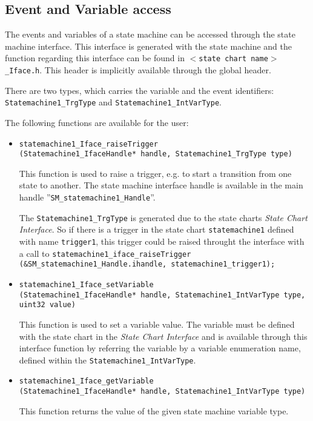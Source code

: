 \subsection{Event and Variable access}

The events and variables of a state machine can be accessed through the state
machine interface. This interface is generated with the state machine and the
function regarding this interface can be found in \texttt{$<$state chart
name$>$\_Iface.h}. This header is implicitly available through the global header.

There are two types, which carries the variable and the event identifiers:
\texttt{Statemachine1\_TrgType} and \texttt{Statemachine1\_IntVarType}.

The following functions are available for the user:

\begin{itemize}
\item \texttt{statemachine1\_Iface\_raiseTrigger\\(Statemachine1\_IfaceHandle*
handle, Statemachine1\_TrgType type)}

This function is used to raise a trigger, e.g. to start a transition from one
state to another. The state machine interface handle is available in the main
handle ''\texttt{SM\_statemachine1\_Handle}''.

The \texttt{Statemachine1\_TrgType} is generated due to the state charts
\textit{State Chart Interface}. So if there is a trigger in the state chart
\texttt{statemachine1} defined with name \texttt{trigger1}, this trigger could be
raised throught the interface with a call to
\texttt{statemachine1\_iface\_raiseTrigger (\&SM\_statemachine1\_Handle.ihandle,
statemachine1\_trigger1);}
 
\item \texttt{statemachine1\_Iface\_setVariable\\(Statemachine1\_IfaceHandle*
handle, Statemachine1\_IntVarType type, uint32 value)}

This function is used to set a variable value. The variable must be defined with
the state chart in the \textit{State Chart Interface} and is available through
this interface function by referring the variable by a variable enumeration name,
defined within the \texttt{Statemachine1\_IntVarType}.

\item \texttt{statemachine1\_Iface\_getVariable\\(Statemachine1\_IfaceHandle*
handle, Statemachine1\_IntVarType type)}

This function returns the value of the given state machine variable type.

\end{itemize}   

